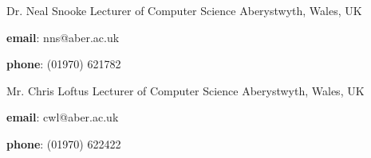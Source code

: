 

\begin{cventries}

  \cventry
    {Dr. Neal Snooke} %
    {Lecturer of Computer Science} %
    {Aberystwyth, Wales, UK} %
    {} %
    {
      \begin{cvitems} %
        \item {\textbf{email}: nns@aber.ac.uk}
        \item {\textbf{phone}: (01970) 621782}
      \end{cvitems}
    }
    
  \cventry
    {Mr. Chris Loftus} %
    {Lecturer of Computer Science} %
    {Aberystwyth, Wales, UK} %
    {} %
    {
      \begin{cvitems} %
        \item {\textbf{email}: cwl@aber.ac.uk}
        \item {\textbf{phone}: (01970) 622422}
      \end{cvitems}
    }

\end{cventries}
